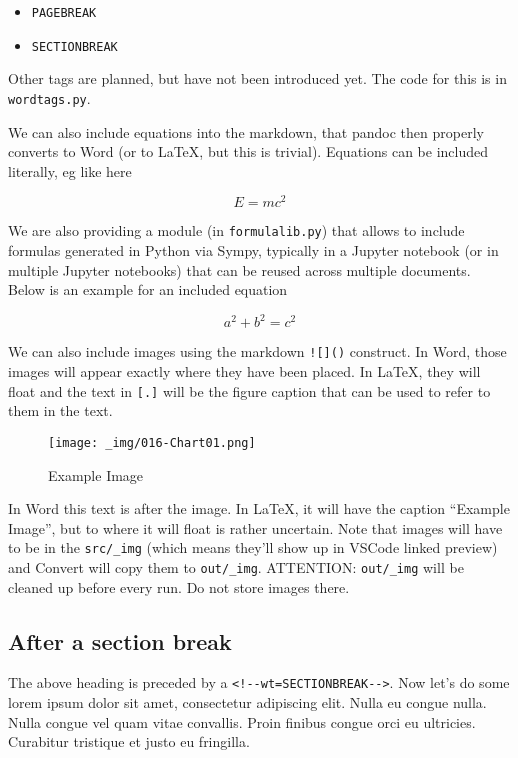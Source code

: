 \documentclass[11pt]{article}
\def\tightlist{}
\begin{document}
\begin{itemize}
\tightlist
\item
  \texttt{PAGEBREAK}
\item
  \texttt{SECTIONBREAK}
\end{itemize}

Other tags are planned, but have not been introduced yet. The code for
this is in \texttt{wordtags.py}.

We can also include equations into the markdown, that pandoc then
properly converts to Word (or to LaTeX, but this is trivial). Equations
can be included literally, eg like here

\[
E = mc^2
\]

We are also providing a module (in \texttt{formulalib.py}) that allows
to include formulas generated in Python via Sympy, typically in a
Jupyter notebook (or in multiple Jupyter notebooks) that can be reused
across multiple documents. Below is an example for an included equation

\[
a^{2} + b^{2} = c^{2}
\]

We can also include images using the markdown \texttt{!{[}{]}()}
construct. In Word, those images will appear exactly where they have
been placed. In LaTeX, they will float and the text in \texttt{{[}.{]}}
will be the figure caption that can be used to refer to them in the
text.

\begin{figure}
\centering
\texttt{[image: \_img/016-Chart01.png]}
\caption{Example Image}
\end{figure}

In Word this text is after the image. In LaTeX, it will have the caption
``Example Image'', but to where it will float is rather uncertain. Note
that images will have to be in the \texttt{src/\_img} (which means
they'll show up in VSCode linked preview) and Convert will copy them to
\texttt{out/\_img}. ATTENTION: \texttt{out/\_img} will be cleaned up
before every run. Do not store images there.


\hypertarget{after-a-section-break}{%
\subsection{After a section break}\label{after-a-section-break}}

The above heading is preceded by a
\texttt{\textless{}!-\/-wt=SECTIONBREAK-\/-\textgreater{}}. Now let's do
some lorem ipsum dolor sit amet, consectetur adipiscing elit. Nulla eu
congue nulla. Nulla congue vel quam vitae convallis. Proin finibus
congue orci eu ultricies. Curabitur tristique et justo eu fringilla.
\end{document}
